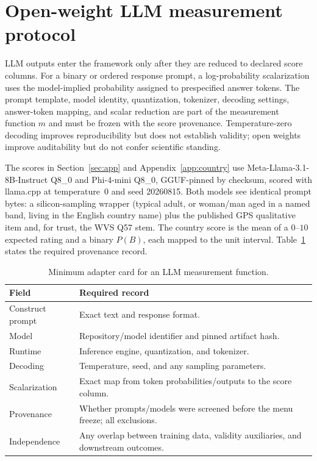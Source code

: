 \documentclass[10pt,letterpaper]{article}
\begin{document}
\section{Open-weight LLM measurement protocol}
\label{app:llm}

LLM outputs enter the framework only after they are reduced to declared score columns.
For a binary or ordered response prompt, a log-probability scalarization uses the model-implied probability assigned to prespecified answer tokens.
The prompt template, model identity, quantization, tokenizer, decoding settings, answer-token mapping, and scalar reduction are part of the measurement function $m$ and must be frozen with the score provenance.
Temperature-zero decoding improves reproducibility but does not establish validity; open weights improve auditability but do not confer scientific standing.

The scores in Section~\ref{sec:app} and Appendix~\ref{app:country} use Meta-Llama-3.1-8B-Instruct Q8\_0 and Phi-4-mini Q8\_0, GGUF-pinned by checksum, scored with llama.cpp at temperature~0 and seed 20260815.
Both models see identical prompt bytes: a silicon-sampling wrapper (typical adult, or woman/man aged in a named band, living in the English country name) plus the published GPS qualitative item and, for trust, the WVS Q57 stem.
The country score is the mean of a $0$--$10$ expected rating and a binary $P(B)$, each mapped to the unit interval.
Table~\ref{tab:adapter} states the required provenance record.

\begin{table}[ht]
\centering
\small
\caption{Minimum adapter card for an LLM measurement function.}
\label{tab:adapter}
\begin{tabularx}{\textwidth}{@{}>{\raggedright\arraybackslash}p{3.0cm} X@{}}
\toprule
\textbf{Field} & \textbf{Required record} \\
\midrule
Construct prompt & Exact text and response format. \\
Model & Repository/model identifier and pinned artifact hash. \\
Runtime & Inference engine, quantization, and tokenizer. \\
Decoding & Temperature, seed, and any sampling parameters. \\
Scalarization & Exact map from token probabilities/outputs to the score column. \\
Provenance & Whether prompts/models were screened before the menu freeze; all exclusions. \\
Independence & Any overlap between training data, validity auxiliaries, and downstream outcomes. \\
\bottomrule
\end{tabularx}
\end{table}
\end{document}
